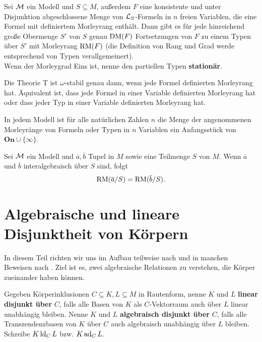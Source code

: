 	\begin{fact}
		Sei $\mathcal{M}$ ein Modell und $S\subseteq M$, außerdem $F$ eine konsistente und unter Disjunktion abgeschlossene Menge von $\mathcal{L}_S$-Formeln in $n$ freien Variablen, die eine Formel mit definiertem Morleyrang enthält. Dann gibt es für jede hinreichend große Obermenge $S'$ von $S$ genau $\operatorname{DM}(F)$ Fortsetzungen von $F$ zu einem Typen über $S'$ mit Morleyrang $\operatorname{RM}(F)$ (die Definition von Rang und Grad werde entsprechend von Typen verallgemeinert).\\
		Wenn der Morleygrad Eins ist, nenne den partiellen Typen \textbf{stationär}. 
	\end{fact}
	
	\begin{fact}\label{Stabilität Morleyrang}
		Die Theorie T ist $\omega$-stabil genau dann, wenn jede Formel definierten Morleyrang hat. Äquivalent ist, dass jede Formel in einer Variable definierten Morleyrang hat oder dass jeder Typ in einer Variable definierten Morleyrang hat.
	\end{fact}
	
	\begin{fact}\label{Anfangsstück}
		In jedem Modell ist für alle natürlichen Zahlen $n$ die Menge der angenommenen Morleyränge von Formeln oder Typen in $n$ Variablen ein Anfangsstück von $\textbf{On}\cup\{\infty\}$.
	\end{fact}
	
	\begin{fact}
		Sei $\mathcal{M}$ ein Modell und $\overline{a},\overline{b}$ Tupel in $M$ sowie eine Teilmenge $S$ von $M$. Wenn $\overline{a}$ und $\overline{b}$ interalgebraisch über $S$ sind, folgt $$\operatorname{RM}(\overline{a}/S)=\operatorname{RM}(\overline{b}/S).$$
	\end{fact}
	
	\section{Algebraische und lineare Disjunktheit von Körpern}
	In diesem Teil richten wir uns im Aufbau teilweise nach \cite{Delon} und in manchen Beweisen nach \cite{SergeLang}. Ziel ist es, zwei algebraische Relationen zu verstehen, die Körper zueinander haben können.
	
    \begin{definition}
    	Gegeben Körperinklusionen $C\subseteq K,L\subseteq M$ in Rautenform, nenne $K$ und $L$ \textbf{linear disjunkt über} $C$, falls alle Basen von $K$ als $C$-Vektorraum auch über $L$ linear unabhängig bleiben. Nenne $K$ und $L$ \textbf{algebraisch disjunkt über} $C$, falls alle Transzendenzbasen von $K$ über $C$ auch algebraisch unabhängig über $L$ bleiben. Schreibe $K\operatorname{ld}_CL$ bzw. $K\operatorname{ad}_CL$.
    \end{definition}
    
